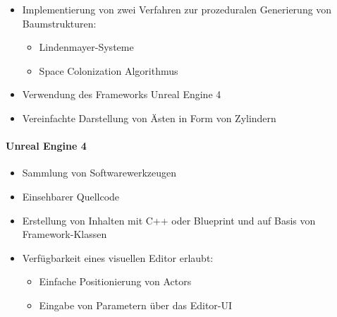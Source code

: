\begin{itemize}
	\item Implementierung von zwei Verfahren zur prozeduralen Generierung von Baumstrukturen:
	\begin{itemize}
		\item Lindenmayer-Systeme
		\item Space Colonization Algorithmus\\
	\end{itemize}
	\item Verwendung des Frameworks \glqq Unreal Engine 4\grqq\\
	
	\item Vereinfachte Darstellung von Ästen in Form von Zylindern
\end{itemize}

\newpage
{}
\paragraph{Unreal Engine 4\\}

\begin{itemize}
	\item Sammlung von Softwarewerkzeugen \\
	
	\item Einsehbarer Quellcode \\
	
	\item Erstellung von Inhalten mit C++ oder Blueprint und auf Basis von Framework-Klassen\\
	
	\item Verfügbarkeit eines visuellen Editor erlaubt:
	\begin{itemize}
		\item Einfache Positionierung von Actors
		\item Eingabe von Parametern über das Editor-UI
	\end{itemize}
\end{itemize}

